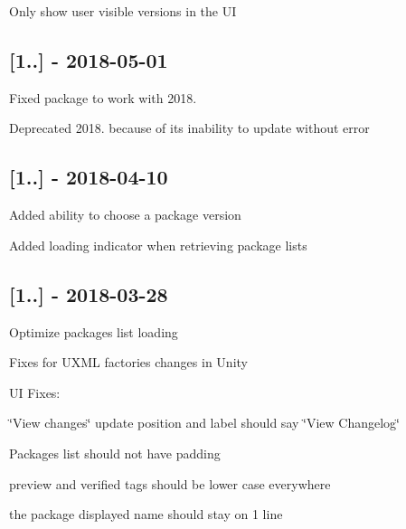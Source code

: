 \begin{DoxyItemize}
\item Only show user visible versions in the UI
\end{DoxyItemize}

\subsection*{\mbox{[}1..\mbox{]} -\/ 2018-\/05-\/01}


\begin{DoxyItemize}
\item Fixed package to work with 2018.
\item Deprecated 2018. because of its inability to update without error
\end{DoxyItemize}

\subsection*{\mbox{[}1..\mbox{]} -\/ 2018-\/04-\/10}


\begin{DoxyItemize}
\item Added ability to choose a package version
\item Added loading indicator when retrieving package lists
\end{DoxyItemize}

\subsection*{\mbox{[}1..\mbox{]} -\/ 2018-\/03-\/28}


\begin{DoxyItemize}
\item Optimize packages list loading
\item Fixes for U\+X\+ML factories changes in Unity
\item UI Fixes\+:
\begin{DoxyItemize}
\item \char`\"{}\+View changes\char`\"{} update position and label should say \char`\"{}\+View Changelog\char`\"{}
\item Packages list should not have padding
\item preview and verified tags should be lower case everywhere
\item the package displayed name should stay on 1 line
\end{DoxyItemize}
\end{DoxyItemize}

